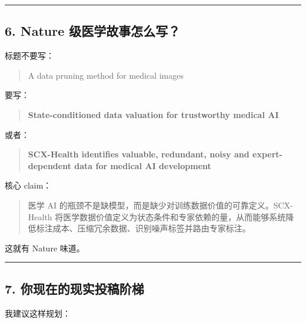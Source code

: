 \documentclass[
  12pt,
]{ctexart}
\begin{document}
\begin{center}\rule{0.5\linewidth}{0.5pt}\end{center}

\subsection{6. Nature
级医学故事怎么写？}\label{nature-ux7ea7ux533bux5b66ux6545ux4e8bux600eux4e48ux5199}

标题不要写：

\begin{quote}
A data pruning method for medical images
\end{quote}

要写：

\begin{quote}
\textbf{State-conditioned data valuation for trustworthy medical AI}
\end{quote}

或者：

\begin{quote}
\textbf{SCX-Health identifies valuable, redundant, noisy and
expert-dependent data for medical AI development}
\end{quote}

核心 claim：

\begin{quote}
医学 AI 的瓶颈不是缺模型，而是缺少对训练数据价值的可靠定义。SCX-Health
将医学数据价值定义为状态条件和专家依赖的量，从而能够系统降低标注成本、压缩冗余数据、识别噪声标签并路由专家标注。
\end{quote}

这就有 Nature 味道。

\begin{center}\rule{0.5\linewidth}{0.5pt}\end{center}

\subsection{7.
你现在的现实投稿阶梯}\label{ux4f60ux73b0ux5728ux7684ux73b0ux5b9eux6295ux7a3fux9636ux68af}

我建议这样规划：
\end{document}
